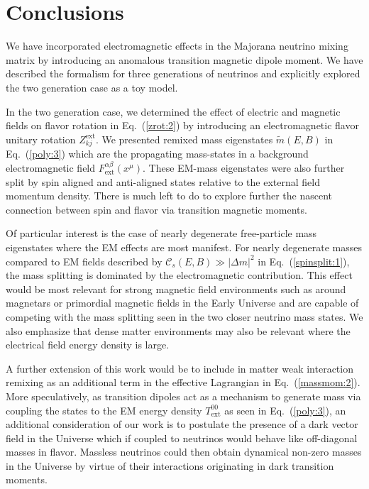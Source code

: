 \documentclass{ws-ijmpa}
\newcommand{\req}[1]{Eq.~(\ref{#1})}
\begin{document}
\section{Conclusions}
\label{sec:conclusions}
We have incorporated electromagnetic effects in the Majorana neutrino mixing matrix by introducing an anomalous transition magnetic dipole moment. We have described the formalism for three generations of neutrinos and explicitly explored the two generation case as a toy model. 

In the two generation case, we determined the effect of electric and magnetic fields on flavor rotation in \req{zrot:2} by introducing an electromagnetic flavor unitary rotation $Z_{kj}^\mathrm{ext}$. We presented remixed mass eigenstates $\widetilde m(E,B)$ in \req{poly:3} which are the propagating mass-states in a background electromagnetic field $F^{\alpha\beta}_\mathrm{ext}(x^{\mu})$. These EM-mass eigenstates were also further split by spin aligned and anti-aligned states relative to the external field momentum density. There is much left to do to explore further the nascent connection between spin and flavor via transition magnetic moments. 

Of particular interest is the case of nearly degenerate free-particle mass eigenstates where the EM effects are most manifest. For nearly degenerate masses compared to EM fields described by $\mathcal{C}_{s}(E,B)\gg|\Delta m|^{2}$ in \req{spinsplit:1}, the mass splitting is dominated by the electromagnetic contribution. This effect would be most relevant for strong magnetic field environments such as around magnetars or primordial magnetic fields in the Early Universe and are capable of competing with the mass splitting seen in the two closer neutrino mass states. We also emphasize that dense matter environments may also be relevant where the electrical field energy density is large.

A further extension of this work would be to include in matter weak interaction remixing as an additional term in the effective Lagrangian in \req{massmom:2}. More speculatively, as transition dipoles act as a mechanism to generate mass via coupling the states to the EM energy density $T_\mathrm{ext}^{00}$ as seen in \req{poly:3}, an additional consideration of our work is to postulate the presence of a dark vector field in the Universe which if coupled to neutrinos would behave like off-diagonal masses in flavor. Massless neutrinos could then obtain dynamical non-zero masses in the Universe by virtue of their interactions originating in dark transition moments.
\end{document}
